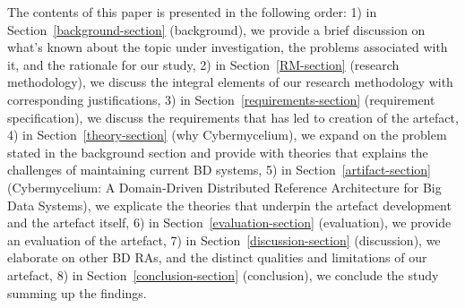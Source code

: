 \documentclass[review]{elsarticle}
\begin{document}
The contents of this paper is presented in the following order: 1) in Section~\ref*{background-section} (background), we provide a brief discussion on what's known about the topic under investigation, the problems associated with it, and the rationale for our study, 2) in Section~\ref*{RM-section} (research methodology), we discuss the integral elements of our research methodology with corresponding justifications, 3) in Section~\ref*{requirements-section} (requirement specification), we discuss the requirements that has led to creation of the artefact, 4) in Section~\ref*{theory-section} (why Cybermycelium), we expand on the problem stated in the background section and provide with theories that explains the challenges of maintaining current BD systems, 5) in Section~\ref*{artifact-section} (Cybermycelium: A Domain-Driven Distributed Reference Architecture for Big Data Systems), we explicate the theories that underpin the artefact development and the artefact itself, 6) in Section~\ref*{evaluation-section} (evaluation), we provide an evaluation of the artefact, 7) in Section~\ref*{discussion-section} (discussion), we elaborate on other BD RAs, and the distinct qualities and limitations of our artefact, 8) in Section~\ref*{conclusion-section} (conclusion), we conclude the study summing up the findings.





\end{document}
